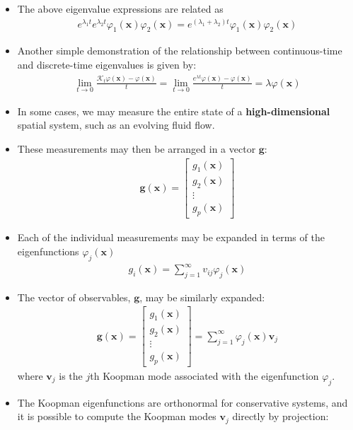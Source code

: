 \documentclass[hyperref={pdfpagemode=FullScreen},aspectratio=169]{beamer}
\begin{document}
\begin{frame}{}
\begin{itemize}
\setlength\itemsep{1em}
\item The above eigenvalue expressions are related as
\begin{align}
e^{\lambda_1 t} e^{\lambda_2 t} \varphi_1(\mathbf{x}) \varphi_2(\mathbf{x}) = e^{(\lambda_1 + \lambda_2)t} \varphi_1(\mathbf{x}) \varphi_2(\mathbf{x})
\end{align}
\item Another simple demonstration of the relationship between continuous-time and discrete-time eigenvalues is given by:
\begin{align}
\lim_{t \to 0} \frac{\mathcal{K}_t \varphi(\mathbf{x}) - \varphi(\mathbf{x})}{t} = \lim_{t \to 0} \frac{e^{\lambda t} \varphi(\mathbf{x}) - \varphi(\mathbf{x})}{t} = \lambda \varphi(\mathbf{x})
\end{align}
\item In some cases, we may measure the entire state of a \textbf{high-dimensional} spatial system, such as an evolving fluid flow.
\item These measurements may then be arranged in a vector $\mathbf{g}$:
\begin{align}
\mathbf{g}(\mathbf{x}) = \begin{bmatrix} g_1(\mathbf{x}) \\ g_2(\mathbf{x}) \\ \vdots \\ g_p(\mathbf{x}) \end{bmatrix}
\end{align}
\end{itemize}
\end{frame}
\begin{frame}{}
\begin{itemize}
\setlength\itemsep{1em}
\item Each of the individual measurements may be expanded in terms of the eigenfunctions $\varphi_j(\mathbf{x})$
\begin{align}
g_i(\mathbf{x}) = \sum_{j=1}^{\infty} v_{ij} \varphi_j(\mathbf{x})
\end{align}
\item The vector of observables, $\mathbf{g}$, may be similarly expanded:
\begin{align}
\mathbf{g}(\mathbf{x}) = \begin{bmatrix} g_1(\mathbf{x}) \\ g_2(\mathbf{x}) \\ \vdots \\ g_p(\mathbf{x}) \end{bmatrix} = \sum_{j=1}^{\infty} \varphi_j(\mathbf{x}) \mathbf{v}_j
\end{align}
where $\mathbf{v}_j$ is the $j$th Koopman mode associated with the eigenfunction $\varphi_j$.
\item The Koopman eigenfunctions are orthonormal for conservative systems, and it is possible to compute the Koopman modes $\mathbf{v}_j$ directly by projection:

\end{itemize}
\end{frame}
\end{document}
